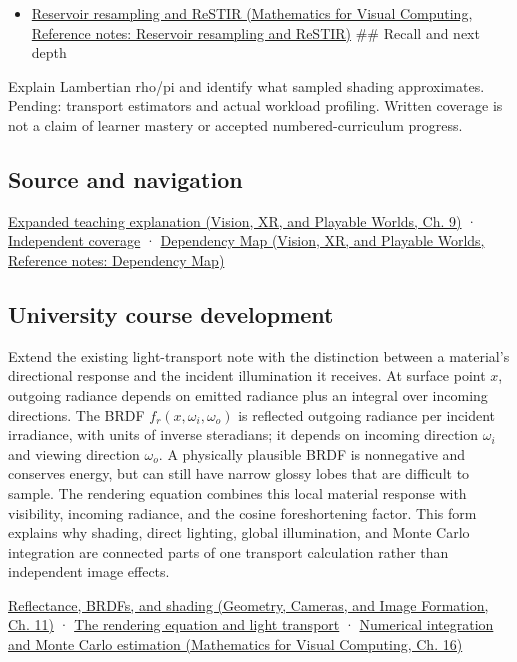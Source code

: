 \begin{itemize}
\tightlist
\item
  \href{../02-Mathematics-for-Visual-Computing/main.pdf\#nameddest=appendix-68be451b78b1}{Reservoir resampling and ReSTIR (Mathematics for Visual Computing, Reference notes: Reservoir resampling and ReSTIR)} \#\# Recall and next depth
\end{itemize}

Explain Lambertian rho/pi and identify what sampled shading approximates. Pending: transport estimators and actual workload profiling. Written coverage is not a claim of learner mastery or accepted numbered-curriculum progress.

\subsection{Source and navigation}\label{appendix-96da0b153b77-source-and-navigation}

\href{../07-Vision-XR-and-Playable-Worlds/main.pdf\#nameddest=04-visual-computing-ii-ch042-materials-turn-incoming-light-into-outgoing-light}{Expanded teaching explanation (Vision, XR, and Playable Worlds, Ch. 9)} · \hyperref[appendix-fd090d982a15-xr01---independent-seeing-and-representation-source]{Independent coverage} · \href{../07-Vision-XR-and-Playable-Worlds/main.pdf\#nameddest=appendix-4ad47bdd269a}{Dependency Map (Vision, XR, and Playable Worlds, Reference notes: Dependency Map)}

\subsection{University course development}\label{appendix-96da0b153b77-university-course-development}

Extend the existing light-transport note with the distinction between a material's directional response and the incident illumination it receives. At surface point \(x\), outgoing radiance depends on emitted radiance plus an integral over incoming directions. The BRDF \(f_r(x,\omega_i,\omega_o)\) is reflected outgoing radiance per incident irradiance, with units of inverse steradians; it depends on incoming direction \(\omega_i\) and viewing direction \(\omega_o\). A physically plausible BRDF is nonnegative and conserves energy, but can still have narrow glossy lobes that are difficult to sample. The rendering equation combines this local material response with visibility, incoming radiance, and the cosine foreshortening factor. This form explains why shading, direct lighting, global illumination, and Monte Carlo integration are connected parts of one transport calculation rather than independent image effects.

\href{../03-Geometry-Cameras-and-Image-Formation/main.pdf\#nameddest=03-visual-computing-i-ch004-reflectance-brdfs-and-shading}{Reflectance, BRDFs, and shading (Geometry, Cameras, and Image Formation, Ch. 11)} · \hyperref[03-visual-computing-i-ch007-the-rendering-equation-and-light-transport]{The rendering equation and light transport} · \href{../02-Mathematics-for-Visual-Computing/main.pdf\#nameddest=03-visual-computing-i-ch012-numerical-integration-and-monte-carlo-estimation}{Numerical integration and Monte Carlo estimation (Mathematics for Visual Computing, Ch. 16)}
